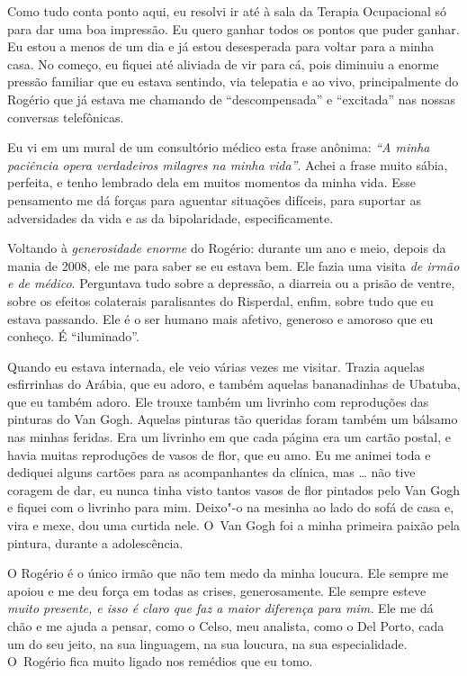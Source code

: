 Como tudo conta ponto aqui, eu resolvi ir até à sala da Terapia
Ocupacional só para dar uma boa impressão. Eu quero ganhar todos os
pontos que puder ganhar. Eu estou a menos de um dia e já estou
desesperada para voltar para a minha casa. No começo, eu fiquei até
aliviada de vir para cá, pois diminuiu a enorme pressão familiar que eu
estava sentindo, via telepatia e ao vivo, principalmente do Rogério que
já estava me chamando de ``descompensada'' e ``excitada'' nas nossas
conversas telefônicas.

Eu vi em um mural de um consultório médico esta frase anônima: \emph{``A
minha paciência opera verdadeiros milagres na minha vida''}. Achei a
frase muito sábia, perfeita, e tenho lembrado dela em muitos momentos da
minha vida. Esse pensamento me dá forças para aguentar situações
difíceis, para suportar as adversidades da vida e as da bipolaridade,
especificamente.

Voltando à \emph{generosidade enorme} do Rogério: durante um ano e meio,
depois da mania de 2008, ele me     para saber se
eu estava bem. Ele fazia uma visita \emph{de irmão e de médico}.
Perguntava tudo sobre a depressão, a diarreia ou a prisão de ventre,
sobre os efeitos colaterais paralisantes do Risperdal, enfim, sobre
tudo que eu estava passando. Ele é o ser humano mais afetivo, generoso e
amoroso que eu conheço. É ``iluminado''.

Quando eu estava internada, ele veio várias vezes me visitar. Trazia
aquelas esfirrinhas do Arábia, que eu adoro, e também aquelas
bananadinhas de Ubatuba, que eu também adoro. Ele trouxe também um
livrinho com reproduções das pinturas do Van Gogh. Aquelas pinturas tão
queridas foram também um bálsamo nas minhas feridas. Era um livrinho em
que cada página era um cartão postal, e havia muitas reproduções de
vasos de flor, que eu amo. Eu me animei toda e dediquei alguns cartões
para as acompanhantes da clínica, mas … não tive coragem de dar,
eu nunca tinha visto tantos vasos de flor pintados pelo Van Gogh e
fiquei com o livrinho para mim. Deixo"-o na mesinha ao lado do sofá de
casa e, vira e mexe, dou uma curtida nele. O~Van Gogh foi a minha
primeira paixão pela pintura, durante a adolescência.

O Rogério é o único irmão que não tem medo da minha loucura. Ele sempre
me apoiou e me deu força em todas as crises, generosamente. Ele sempre
esteve \emph{muito presente, e isso é claro que faz a maior diferença
para mim.} Ele me dá chão e me ajuda a pensar, como o Celso, meu
analista, como o Del Porto, cada um do seu jeito, na sua linguagem, na
sua loucura, na sua especialidade. O~Rogério fica muito ligado nos
remédios que eu tomo.

